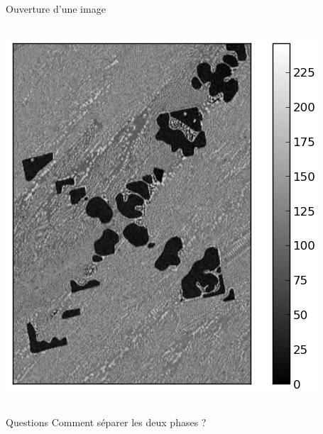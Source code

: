 \documentclass[8pt,a4paper]{beamer}
\begin{document}
\begin{frame}{Ouverture d'une image}
  \begin{columns}
\includegraphics[width=1.\textwidth]{figures/image_original.png}

\end{columns}
\begin{alertblock}{Questions}
Comment séparer les deux phases ?
\end{alertblock}
\end{frame}
\end{document}
